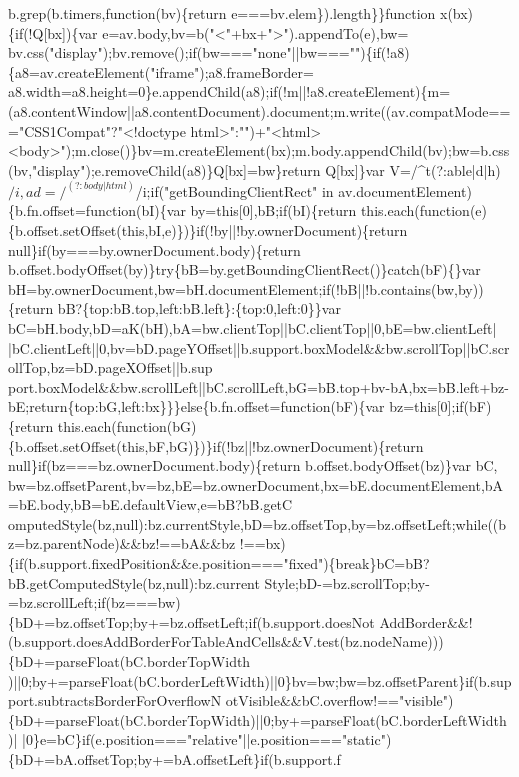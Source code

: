 \begin{DoxyCode}
{       b.grep(b.timers,function(bv)\{return e===bv.elem\}).length\}\}function x(bx)\{if(!Q[bx])\{var
       e=av.body,bv=b("<"+bx+">").appendTo(e),bw=
      bv.css("display");bv.remove();if(bw==="none"||bw==="")\{if(!a8)\{a8=av.createElement("iframe");a8.frameBorder=
      a8.width=a8.height=0\}e.appendChild(a8);if(!m||!a8.createElement)\{m=(a8.contentWindow||a8.contentDocument).document;m.write((av.compatMode==="CSS1Compat"?"<!doctype
       html>":"")+"<html><body>");m.close()\}bv=m.createElement(bx);m.body.appendChild(bv);bw=b.css(bv,"display");e.removeChild(a8)\}Q[bx]=bw\}return Q[bx]\}var
       V=/^t(?:able|d|h)$/i,ad=/^(?:body|html)$/i;if("getBoundingClientRect" in
       av.documentElement)\{b.fn.offset=function(bI)\{var by=this[0],bB;if(bI)\{return
       this.each(function(e)\{b.offset.setOffset(this,bI,e)\})\}if(!by||!by.ownerDocument)\{return null\}if(by===by.ownerDocument.body)\{return
       b.offset.bodyOffset(by)\}try\{bB=by.getBoundingClientRect()\}catch(bF)\{\}var bH=by.ownerDocument,bw=bH.documentElement;if(!bB||!b.contains(bw,by))\{return
       bB?\{top:bB.top,left:bB.left\}:\{top:0,left:0\}\}var
       bC=bH.body,bD=aK(bH),bA=bw.clientTop||bC.clientTop||0,bE=bw.clientLeft|
      |bC.clientLeft||0,bv=bD.pageYOffset||b.support.boxModel&&bw.scrollTop||bC.scrollTop,bz=bD.pageXOffset||b.sup
      port.boxModel&&bw.scrollLeft||bC.scrollLeft,bG=bB.top+bv-bA,bx=bB.left+bz-bE;return\{top:bG,left:bx\}\}\}else\{b.fn.offset=function(bF)\{var bz=this[0];if(bF)\{return
       this.each(function(bG)\{b.offset.setOffset(this,bF,bG)\})\}if(!bz||!bz.ownerDocument)\{return null\}if(bz===bz.ownerDocument.body)\{return b.offset.bodyOffset(bz)\}var
       bC,
      bw=bz.offsetParent,bv=bz,bE=bz.ownerDocument,bx=bE.documentElement,bA=bE.body,bB=bE.defaultView,e=bB?bB.getC
      omputedStyle(bz,null):bz.currentStyle,bD=bz.offsetTop,by=bz.offsetLeft;while((bz=bz.parentNode)&&bz!==bA&&bz
      !==bx)\{if(b.support.fixedPosition&&e.position==="fixed")\{break\}bC=bB?bB.getComputedStyle(bz,null):bz.current
      Style;bD-=bz.scrollTop;by-=bz.scrollLeft;if(bz===bw)\{bD+=bz.offsetTop;by+=bz.offsetLeft;if(b.support.doesNot
      AddBorder&&!(b.support.doesAddBorderForTableAndCells&&V.test(bz.nodeName)))\{bD+=parseFloat(bC.borderTopWidth
      )||0;by+=parseFloat(bC.borderLeftWidth)||0\}bv=bw;bw=bz.offsetParent\}if(b.support.subtractsBorderForOverflowN
      otVisible&&bC.overflow!=="visible")\{bD+=parseFloat(bC.borderTopWidth)||0;by+=parseFloat(bC.borderLeftWidth)|
      |0\}e=bC\}if(e.position==="relative"||e.position==="static")\{bD+=bA.offsetTop;by+=bA.offsetLeft\}if(b.support.f
}
\end{DoxyCode}
